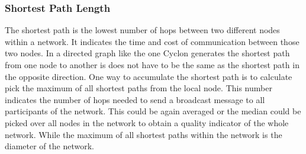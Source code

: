 \subsubsection{Shortest Path Length}
The shortest path is the lowest number of hops between two different nodes
within a network. It indicates the time and cost of communication between those
two nodes. In a directed graph like the one Cyclon generates the shortest path
from one node to another is does not have to be the same as the shortest path in
the opposite direction. One way to accumulate the shortest path is to calculate
pick the maximum of all shortest paths from the local node. This number
indicates the number of hops needed to send a broadcast message to all
participants of the network. This could be again averaged or the median could be
picked over all nodes in the network to obtain a quality indicator of the whole
network. While the maximum of all shortest paths within the network is the
diameter of the network.
